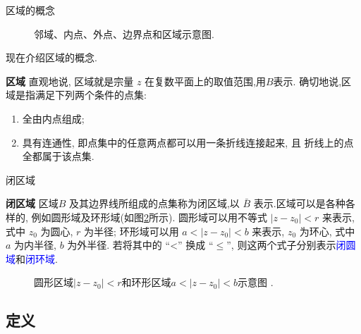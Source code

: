 \documentclass[fontset=windows, chinese, 10pt]{beamer}
\newcommand{\blue}[1]{\textcolor{blue}{#1}}
\begin{document}
  \begin{frame}{区域的概念}

    \begin{figure}[htb]
      \centering
      \scalebox{0.6}{
        }
      \caption{邻域、内点、外点、边界点和区域示意图.}
      \label{fig:region}
  \end{figure}
  
  
  
  现在介绍区域的概念. 
  
  \textbf{区域} \quad 直观地说,  区域就是宗量 $z$ 在复数平面上的取值范围,用$B$表示. 
  确切地说,区域是指满足下列两个条件的点集:
      \begin{enumerate}
          \item 全由内点组成;
          \item 具有连通性, 即点集中的任意两点都可以用一条折线连接起来, 且 折线上的点全都属于该点集.
      \end{enumerate}
  \end{frame}
  

  \begin{frame}{闭区域}
    
    \textbf{闭区域} \quad 区域$B$ 及其边界线所组成的点集称为闭区域,以 $\bar{B}$ 表示.区域可以是各种各样的, 例如圆形域及环形域(如图\ref{fig:annular}所示). 
    圆形域可以用不等式 $\left|z-z_0\right|<r$ 来表示, 式中 $z_0$ 为圆心, $r$ 为半径; 
    环形域可以用 $a<\left|z-z_0\right|<b$ 来表示, $z_0$ 为环心, 式中 $a$ 为内半径, $b$ 为外半径.
     若将其中的 “<” 换成 $“ \leqslant ”$, 则这两个式子分别表示\blue{闭圆域}和\blue{闭环域}.
    
    \begin{figure}
        \centering
    
        \scalebox{0.6}{
        
        }
        \caption{ 圆形区域$\left|z-z_0\right|<r$和环形区域$a<\left|z-z_0\right|<b$示意图 .}
        \label{fig:annular}
    \end{figure}
  \end{frame}

  \subsection{定义}
  
\end{document}
